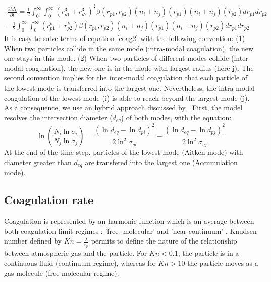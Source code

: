  \begin{eqnarray}
\frac{\partial M_k}{\partial t} = \frac{1}{2} \int_{0}^{\infty} 
\int_{0}^{\infty} (r_{p1}^3 + r_{p2}^3)^{\frac{k}{3}}
\beta(r_{p1},r_{p2}) (n_i + n_j)(r_{p1}) (n_i + n_j)(r_{p2}) dr_{p1} dr_{p2} 
\nonumber \\
- \frac{1}{2} \int_{0}^{\infty} \int_{0}^{\infty}
(r_{p1}^k + r_{p2}^k)  \beta(r_{p1},r_{p2}) (n_i + n_j)(r_{p1}) (n_i + 
n_j)(r_{p2}) dr_{p1} dr_{p2}
\label{coag2}
\end{eqnarray}
It is easy to solve terms of equation \ref{coag2} with the following convention:
(1) When two particles collide in the same mode (intra-modal coagulation), the 
new one stays in this mode.
(2) When two particles of different modes collide (inter-modal coagulation), the 
new one 
is in the mode with largest radius (here j).
The second convention implies for the inter-modal coagulation that each 
particle of the lowest
mode is transferred into the largest one.
Nevertheless, the intra-modal coagulation of the lowest mode (i) is able to 
reach beyond the largest mode (j). As a consequence, we use an hybrid approach 
discussed by \citet{Ackermann-1998}. First, the model resolves the intersection 
diameter ($d_{eq}$) of both modes, with the equation:
 \begin{equation}
 \ln \left(\frac{N_i \ln \sigma_i}{N_j \ln \sigma_j}\right) = \frac{(\ln d_{eq} 
- \ln d_{pi})^2}{2\ln^2 \sigma_{gi}} - \frac{(\ln d_{eq} - \ln d_{pj})^2}{2\ln^2 
\sigma_{gj}}
\label{coag3}
\end{equation}
At the end of the time-step, particles of the lowest mode (Aitken mode) with diameter greater than  $d_{eq}$
are transfered into the largest one (Accumulation mode).

\subsection{Coagulation rate}
Coagulation is represented by an harmonic function which is an
average between both coagulation limit regimes : 'free-
molecular' and 'near continuum' \citep{Whitby-1991}. Knudsen number defined by  $Kn = 
\frac{\lambda}{r_p}$ permits to define
the nature of the relationship between atmospheric gas and the particle. For $Kn < 
0.1$, the particle is in a continuous fluid (continuum regime), whereas for $Kn > 
10$  the particle moves as a gas molecule (free molecular regime).


